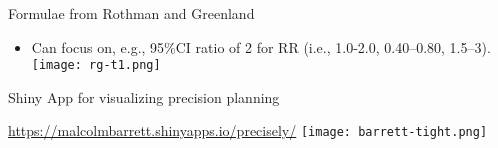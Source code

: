 \documentclass[ignorenonframetext,]{beamer}
\providecommand{\tightlist}{%
  \setlength{\itemsep}{0pt}\setlength{\parskip}{0pt}}
\begin{document}
\begin{frame}{Formulae from Rothman and Greenland}
\protect\hypertarget{formulae-from-rothman-and-greenland}{}

\begin{itemize}
\tightlist
\item
  Can focus on, e.g., 95\%CI ratio of 2 for RR (i.e., 1.0-2.0,
  0.40--0.80, 1.5--3).
  \texttt{[image: rg-t1.png]}
\end{itemize}

\end{frame}

\begin{frame}{Shiny App for visualizing precision planning}
\protect\hypertarget{shiny-app-for-visualizing-precision-planning}{}

\url{https://malcolmbarrett.shinyapps.io/precisely/}
\texttt{[image: barrett-tight.png]}

\end{frame}

\end{document}

